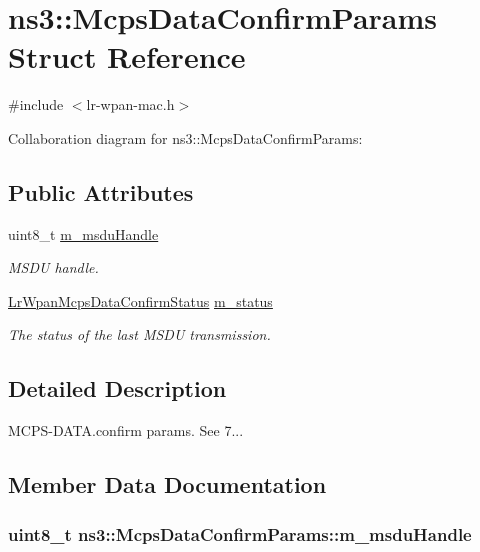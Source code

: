 \hypertarget{structns3_1_1McpsDataConfirmParams}{}\section{ns3\+:\+:Mcps\+Data\+Confirm\+Params Struct Reference}
\label{structns3_1_1McpsDataConfirmParams}


{\ttfamily \#include $<$lr-\/wpan-\/mac.\+h$>$}



Collaboration diagram for ns3\+:\+:Mcps\+Data\+Confirm\+Params\+:
\subsection*{Public Attributes}
\begin{DoxyCompactItemize}
\item 
uint8\+\_\+t \hyperlink{structns3_1_1McpsDataConfirmParams_a904682413689a66770d3bee66ac7e46d}{m\+\_\+msdu\+Handle}
\begin{DoxyCompactList}\small\item\em M\+S\+DU handle. \end{DoxyCompactList}\item 
\hyperlink{group__lr-wpan_ga50d67c8816b2ca8da8df30d045b1b705}{Lr\+Wpan\+Mcps\+Data\+Confirm\+Status} \hyperlink{structns3_1_1McpsDataConfirmParams_a8f62949258fb8ca94621ce33361a3953}{m\+\_\+status}
\begin{DoxyCompactList}\small\item\em The status of the last M\+S\+DU transmission. \end{DoxyCompactList}\end{DoxyCompactItemize}


\subsection{Detailed Description}
M\+C\+P\+S-\/\+D\+A\+T\+A.\+confirm params. See 7... 

\subsection{Member Data Documentation}
\subsubsection[{\texorpdfstring{m\+\_\+msdu\+Handle}{m_msduHandle}}]{\setlength{\rightskip}{0pt plus 5cm}uint8\+\_\+t ns3\+::\+Mcps\+Data\+Confirm\+Params\+::m\+\_\+msdu\+Handle}\hypertarget{structns3_1_1McpsDataConfirmParams_a904682413689a66770d3bee66ac7e46d}{}\label{structns3_1_1McpsDataConfirmParams_a904682413689a66770d3bee66ac7e46d}


